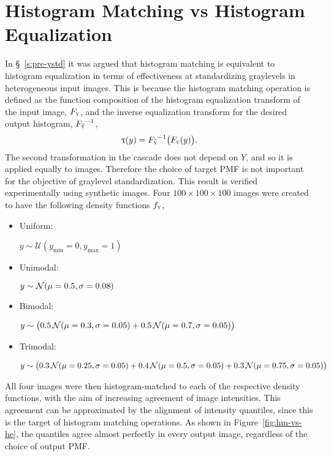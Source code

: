 \section{Histogram Matching vs Histogram Equalization}\label{s:hm-vs-he}
In \S~\ref{s:pre-ystd} it was argued that
histogram matching is equivalent to histogram equalization
in terms of effectiveness at standardizing graylevels in heterogeneous input images.
This is because the histogram matching operation is defined as
the function composition of the histogram equalization transform of the input image, $F_{\textsc{y}}$,
and the inverse equalization transform for the desired output histogram, ${F_{\tilde{\textsc{y}}}}^{-1}$,
\begin{equation}
  \uptau(y) = {F_{\tilde{\textsc{y}}}}^{-1}\big(F_{\textsc{y}}(y)\big).
\end{equation}
The second transformation in the cascade does not depend on $Y$,
and so it is applied equally to images.
Therefore the choice of target PMF is not important for the objective of graylevel standardization.
This result is verified experimentally using synthetic images.
Four $100\times100\times100$ images were created to have the following density functions $f_{\textsc{y}}$,
\begin{itemize}[itemsep=0pt,topsep=0pt]
  \item \parbox{2cm}{Uniform:}
  $y\sim\mathcal{U}(y_{\min}=0,y_{\max}=1)$
  \item \parbox{2cm}{Unimodal:}
  $y\sim\mathcal{N}(\mu=0.5,\sigma=0.08)$
  \item \parbox{2cm}{Bimodal:}
  $y\sim\big(0.5\thinspace\mathcal{N}(\mu=0.3,\sigma=0.05)
            +0.5\thinspace\mathcal{N}(\mu=0.7,\sigma=0.05)\big)$
  \item \parbox{2cm}{Trimodal:}
  $y\sim\big(0.3\thinspace\mathcal{N}(\mu=0.25,\sigma=0.05)
            +0.4\thinspace\mathcal{N}(\mu=0.5,\sigma=0.05)
            +0.3\thinspace\mathcal{N}(\mu=0.75,\sigma=0.05)\big)$
\end{itemize}
All four images were then histogram-matched to each of the respective density functions,
with the aim of increasing agreement of image intensities.
This agreement can be approximated by the alignment of intensity quantiles,
since this is the target of histogram matching operations.
As shown in Figure~\ref{fig:hm-vs-he}, the quantiles agree almost perfectly in every output image,
regardless of the choice of output PMF.

